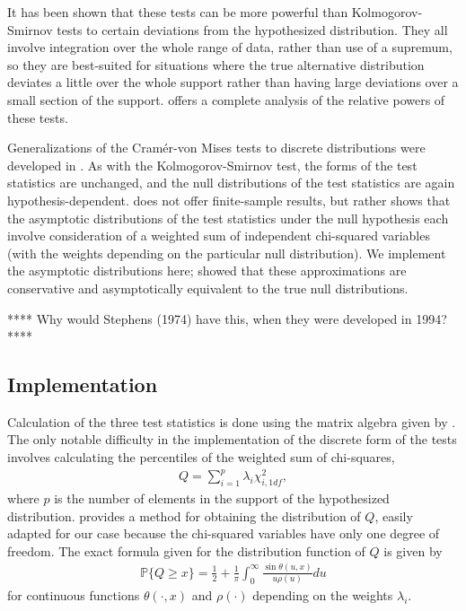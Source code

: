 It has been shown that these tests can be more powerful than Kolmogorov-Smirnov tests to certain deviations from the hypothesized distribution. 
They all involve integration over the whole range of data, rather than
use of a supremum, so they are best-suited for situations where the
true alternative distribution deviates a little over the whole support
rather than having large deviations over a small section of the support. 
\cite{stephens1974} offers a complete analysis of the relative powers
of these tests.



Generalizations of the Cram\'{e}r-von Mises tests to discrete
distributions were developed in \cite{choulakian1994}. As with the
Kolmogorov-Smirnov test, the forms of the test statistics are unchanged, 
and the null distributions of the test statistics are again hypothesis-dependent. \cite{choulakian1994} does not offer finite-sample results, but rather 
shows that the asymptotic distributions of the test statistics under the null hypothesis each involve consideration of a weighted sum of independent
chi-squared variables (with the weights depending on the particular
null distribution). 
We implement the asymptotic distributions here; \cite{stephens1974}
showed that these approximations are conservative 
and asymptotically equivalent to the true null distributions.

**** Why would Stephens (1974) have this, when they were developed in 1994? ****

\subsection{Implementation}

Calculation of the three test statistics is done using the
matrix algebra given by \cite{choulakian1994}. 
The only notable difficulty in the implementation of the discrete form
of the tests involves calculating the percentiles
of the weighted sum of chi-squares,
\begin{align}
Q = \sum_{i=1}^{p} \lambda_i \chi^2_{i,1df},   \label{eqQ}
\end{align}
where $p$ is the number of elements in the support of the hypothesized
distribution.
\cite{imhof1961} provides a method for obtaining the distribution of $Q$,
easily adapted for our case because
the chi-squared variables have only one degree of freedom.
The exact formula given for the distribution function of $Q$
is given by
\begin{align}
\mathbb{P}\{Q \geq x \} = \frac{1}{2} + 
\frac{1}{\pi} \int_{0}^{\infty} \frac{\sin\theta(u,x)}{u \rho(u) } du
\label{distQ}
\end{align}
for continuous functions $\theta(\cdot, x)$ and $\rho(\cdot)$ depending on the  weights $\lambda_i$. 

